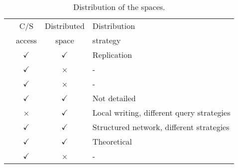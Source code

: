 \begin{savenotes}
  \begin{table}[htbp]
    \caption{Distribution of the spaces.}
    \centering
    \begin{tabular}{ l c c p{4cm} }
    \hline 
    & C/S & Distributed & Distribution \\
    & access & space & strategy \\
    \hline 
    \midtsc{} & $\checkmark$ & $\checkmark$ & Replication \\ %
    \midsws{} & $\checkmark$ & × & - \\
    \midstuples{} & $\checkmark$ & × & - \\
    \midcspaces{} & $\checkmark$ & $\checkmark$ & Not detailed \\ %
    \midtscpp{} & × & $\checkmark$  & Local writing, different query strategies \\ %
    \midtripcom{} & $\checkmark$ & $\checkmark$ & Structured network, different strategies \\
    \midsmartmt{} & $\checkmark$ &  $\checkmark$ & Theoretical \\ %
    \midnardini{} & $\checkmark$ & × & - \\
    \hline 
    \end{tabular}
    \label{tab:distribution_comparison}
  \end{table}
\end{savenotes}